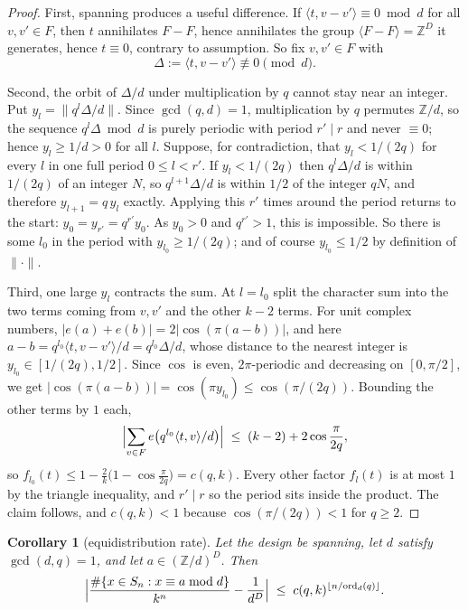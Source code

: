 \documentclass[11pt]{amsart}
\newtheorem{corollary}[theorem]{Corollary}
\theoremstyle{definition}
\theoremstyle{remark}
\begin{document}
\begin{proof}
First, spanning produces a useful difference. If $\langle t, v-v'\rangle \equiv 0 \bmod d$ for all $v,v' \in F$, then $t$ annihilates $F-F$, hence annihilates the group $\langle F-F\rangle = \mathbb{Z}^D$ it generates, hence $t \equiv 0$, contrary to assumption. So fix $v,v' \in F$ with
\[
  \Delta := \langle t, v - v'\rangle \not\equiv 0 \pmod d .
\]

Second, the orbit of $\Delta/d$ under multiplication by $q$ cannot stay near an integer. Put $y_l = \|q^{l}\Delta/d\|$. Since $\gcd(q,d)=1$, multiplication by $q$ permutes $\mathbb{Z}/d$, so the sequence $q^{l}\Delta \bmod d$ is purely periodic with period $r' \mid r$ and never $\equiv 0$; hence $y_l \ge 1/d > 0$ for all $l$. Suppose, for contradiction, that $y_l < 1/(2q)$ for every $l$ in one full period $0 \le l < r'$. If $y_l < 1/(2q)$ then $q^{l}\Delta/d$ is within $1/(2q)$ of an integer $N$, so $q^{l+1}\Delta/d$ is within $1/2$ of the integer $qN$, and therefore $y_{l+1} = q\,y_l$ exactly. Applying this $r'$ times around the period returns to the start: $y_0 = y_{r'} = q^{r'} y_0$. As $y_0 > 0$ and $q^{r'} > 1$, this is impossible. So there is some $l_0$ in the period with $y_{l_0} \ge 1/(2q)$; and of course $y_{l_0} \le 1/2$ by definition of $\|\cdot\|$.

Third, one large $y_l$ contracts the sum. At $l = l_0$ split the character sum into the two terms coming from $v,v'$ and the other $k-2$ terms. For unit complex numbers, $|e(a)+e(b)| = 2|\cos(\pi(a-b))|$, and here $a - b = q^{l_0}\langle t, v-v'\rangle/d = q^{l_0}\Delta/d$, whose distance to the nearest integer is $y_{l_0} \in [1/(2q), 1/2]$. Since $\cos$ is even, $2\pi$-periodic and decreasing on $[0,\pi/2]$, we get $|\cos(\pi(a-b))| = \cos(\pi y_{l_0}) \le \cos(\pi/(2q))$. Bounding the other terms by $1$ each,
\[
  \Bigl|\sum_{v \in F} e\bigl(q^{l_0}\langle t,v\rangle/d\bigr)\Bigr|
  \;\le\; (k-2) + 2\cos\frac{\pi}{2q},
\]
so $f_{l_0}(t) \le 1 - \frac{2}{k}\bigl(1-\cos\frac{\pi}{2q}\bigr) = c(q,k)$. Every other factor $f_l(t)$ is at most $1$ by the triangle inequality, and $r' \mid r$ so the period sits inside the product. The claim follows, and $c(q,k)<1$ because $\cos(\pi/(2q))<1$ for $q \ge 2$.
\end{proof}

\begin{corollary}[equidistribution rate]
\label{cor:equi}
Let the design be spanning, let $d$ satisfy $\gcd(d,q)=1$, and let $a \in (\mathbb{Z}/d)^{D}$. Then
\[
  \Bigl| \frac{\#\{x \in S_n : x \equiv a \bmod d\}}{k^{n}} - \frac{1}{d^{D}} \Bigr|
  \;\le\; c(q,k)^{\lfloor n/\mathrm{ord}_d(q)\rfloor}.
\]
\end{corollary}
\end{document}
